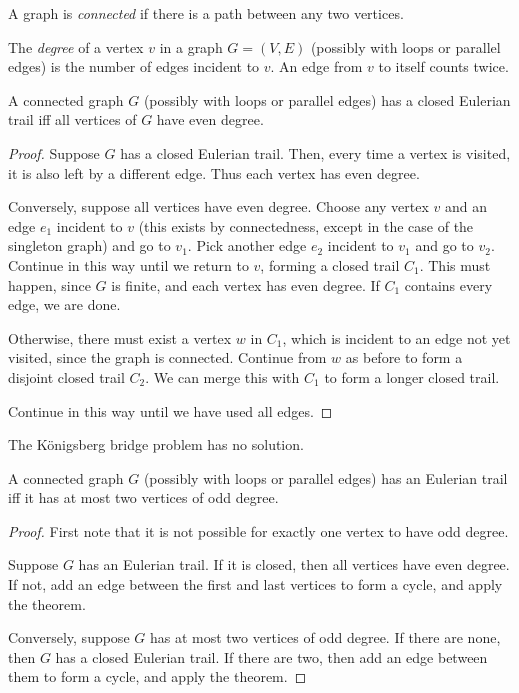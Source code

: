 \begin{definition}[Connectedness] \label{def:graph:connected}
    A graph is \emph{connected} if there is a path between any two vertices.
\end{definition}

\begin{definition}[Degree] \label{def:graph:degree}
    The \emph{degree} of a vertex $v$ in a graph $G = (V, E)$ (possibly
    with loops or parallel edges) is the number of edges incident to $v$.
    An edge from $v$ to itself counts twice.
\end{definition}
\begin{theorem*}[Königsberg] \label{thm:graph:euler}
    A connected graph $G$ (possibly with loops or parallel edges) has a
    closed Eulerian trail iff all vertices of $G$ have even degree.
\end{theorem*}
\begin{proof}
    Suppose $G$ has a closed Eulerian trail.
    Then, every time a vertex is visited, it is also left by a different
    edge.
    Thus each vertex has even degree.

    Conversely, suppose all vertices have even degree.
    Choose any vertex $v$ and an edge $e_1$ incident to $v$ (this exists
    by connectedness, except in the case of the singleton graph) and
    go to $v_1$.
    Pick another edge $e_2$ incident to $v_1$ and go to $v_2$.
    Continue in this way until we return to $v$, forming a closed trail
    $C_1$.
    This must happen, since $G$ is finite, and each vertex has even degree.
    If $C_1$ contains every edge, we are done.

    Otherwise, there must exist a vertex $w$ in $C_1$, which is incident
    to an edge not yet visited, since the graph is connected.
    Continue from $w$ as before to form a disjoint closed trail $C_2$.
    We can merge this with $C_1$ to form a longer closed trail.

    Continue in this way until we have used all edges.
\end{proof}
\begin{corollary*}
    The Königsberg bridge problem has no solution.
\end{corollary*}
\begin{corollary}
    A connected graph $G$ (possibly with loops or parallel edges) has an
    Eulerian trail iff it has at most two vertices of odd degree.
\end{corollary}
\begin{proof}
    First note that it is not possible for exactly one vertex to have odd
    degree.

    Suppose $G$ has an Eulerian trail.
    If it is closed, then all vertices have even degree.
    If not, add an edge between the first and last vertices to form a cycle,
    and apply the theorem.

    Conversely, suppose $G$ has at most two vertices of odd degree.
    If there are none, then $G$ has a closed Eulerian trail.
    If there are two, then add an edge between them to form a cycle,
    and apply the theorem.
\end{proof}

